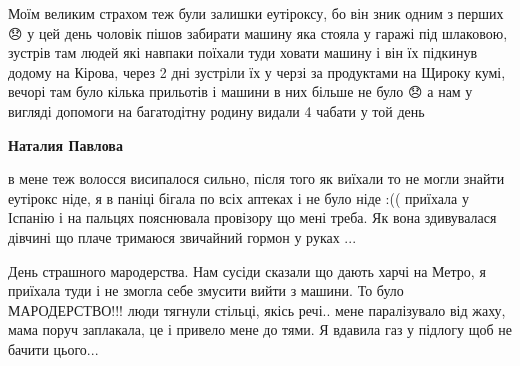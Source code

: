 
Моїм великим страхом теж були залишки еутіроксу, бо він зник одним з перших 😞
у цей день чоловік пішов забирати машину яка стояла у гаражі під шлаковою,
зустрів там людей які навпаки поїхали туди ховати машину і він їх підкинув
додому на Кірова, через 2 дні зустріли їх у черзі за продуктами на Щироку кумі,
вечорі там було кілька прильотів і машини в них більше не було 😞 а нам у
вигляді допомоги на багатодітну родину видали 4 чабати у той день

\begin{itemize} %
\textbf{Наталия Павлова} 

в мене теж волосся висипалося сильно, після того як виїхали то не могли знайти
еутірокс ніде, я в паніці бігала по всіх аптеках і не було ніде :(( приїхала у
Іспанію і на пальцях пояснювала провізору що мені треба. Як вона здивувалася
дівчині що плаче тримаюся звичайний гормон у руках ...

\end{itemize} %


День страшного мародерства. Нам сусіди сказали що дають харчі на Метро, я
приїхала туди і не змогла себе змусити вийти з машини. То було МАРОДЕРСТВО!!!
люди тягнули стільці, якісь речі.. мене паралізувало від жаху, мама поруч
заплакала, це і привело мене до тями. Я вдавила газ у підлогу щоб не бачити
цього...

